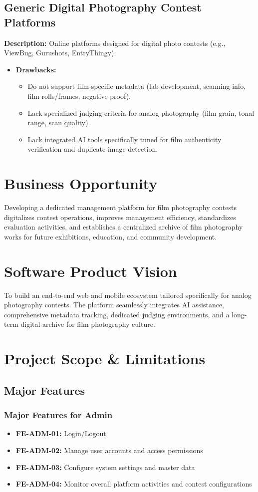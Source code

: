 \subsection{Generic Digital Photography Contest Platforms}
\textbf{Description:} Online platforms designed for digital photo contests (e.g., ViewBug, Gurushots, EntryThingy).
\begin{itemize}
    \item \textbf{Drawbacks:}
    \begin{itemize}
        \item Do not support film-specific metadata (lab development, scanning info, film rolls/frames, negative proof).
        \item Lack specialized judging criteria for analog photography (film grain, tonal range, scan quality).
        \item Lack integrated AI tools specifically tuned for film authenticity verification and duplicate image detection.
    \end{itemize}
\end{itemize}

\section{Business Opportunity}
Developing a dedicated management platform for film photography contests digitalizes contest operations, improves management efficiency, standardizes evaluation activities, and establishes a centralized archive of film photography works for future exhibitions, education, and community development.

\section{Software Product Vision}
To build an end-to-end web and mobile ecosystem tailored specifically for analog photography contests. The platform seamlessly integrates AI assistance, comprehensive metadata tracking, dedicated judging environments, and a long-term digital archive for film photography culture.

\section{Project Scope \& Limitations}
\subsection{Major Features}
\subsubsection{Major Features for Admin}
\begin{itemize}
    \item \textbf{FE-ADM-01:} Login/Logout
    \item \textbf{FE-ADM-02:} Manage user accounts and access permissions
    \item \textbf{FE-ADM-03:} Configure system settings and master data
    \item \textbf{FE-ADM-04:} Monitor overall platform activities and contest configurations
\end{itemize}

